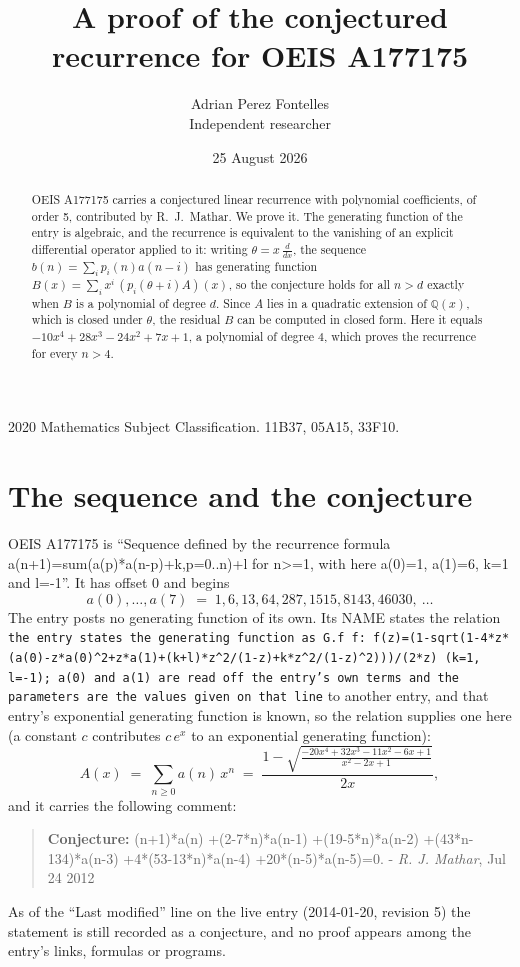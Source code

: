 \documentclass[11pt,a4paper]{article}
\title{A proof of the conjectured recurrence for OEIS A177175}
\author{Adrian Perez Fontelles\\ \small Independent researcher}
\date{25 August 2026}
\theoremstyle{plain}
\theoremstyle{definition}
\begin{document}
\maketitle

\begin{abstract}
OEIS A177175 carries a conjectured linear recurrence with polynomial coefficients, of
order 5, contributed by R.~J.~Mathar. We prove it. The generating function of the
entry is algebraic, and the recurrence is equivalent to the vanishing of an explicit
differential operator applied to it: writing $\theta=x\,\frac{d}{dx}$, the sequence
$b(n)=\sum_{i}p_{i}(n)a(n-i)$ has generating function
$B(x)=\sum_{i}x^{i}\,(p_{i}(\theta+i)A)(x)$, so the conjecture holds for all $n>d$ exactly
when $B$ is a polynomial of degree $d$. Since $A$ lies in a quadratic extension of
$\mathbb{Q}(x)$, which is closed under $\theta$, the residual $B$ can be computed in
closed form. Here it equals $- 10 x^{4} + 28 x^{3} - 24 x^{2} + 7 x + 1$, a polynomial of degree $4$, which proves
the recurrence for every $n>4$.
\end{abstract}

\noindent\small 2020 Mathematics Subject Classification. 11B37, 05A15, 33F10.\normalsize

\section{The sequence and the conjecture}

OEIS A177175 is ``Sequence defined by the recurrence formula a(n+1)=sum(a(p)*a(n-p)+k,p=0..n)+l for n>=1, with here a(0)=1, a(1)=6, k=1 and l=-1''. It has offset $0$ and begins
\[
a(0),\dots,a(7)\;=\;1, 6, 13, 64, 287, 1515, 8143, 46030,\ \dots
\]
The entry posts no generating function of its own. Its NAME states the
relation \texttt{the entry states the generating function as G.f f: f(z)=(1-sqrt(1-4*z*(a(0)-z*a(0)\textasciicircum{}2+z*a(1)+(k+l)*z\textasciicircum{}2/(1-z)+k*z\textasciicircum{}2/(1-z)\textasciicircum{}2)))/(2*z) (k=1, l=-1); a(0) and a(1) are read off the entry's own terms and the parameters are the values given on that line} to another entry, and that entry's exponential generating
function is known, so the relation supplies one here (a constant $c$ contributes
$c\,e^{x}$ to an exponential generating function):
\begin{equation}\label{eq:gf}
A(x)\;=\;\sum_{n\ge 0} a(n)\,x^{n}\;=\;\frac{1 - \sqrt{\frac{- 20 x^{4} + 32 x^{3} - 11 x^{2} - 6 x + 1}{x^{2} - 2 x + 1}}}{2 x} ,
\end{equation}
and it carries the following comment:
\begin{quote}\small
\textbf{Conjecture:} (n+1)*a(n) +(2-7*n)*a(n-1) +(19-5*n)*a(n-2) +(43*n-134)*a(n-3) +4*(53-13*n)*a(n-4) +20*(n-5)*a(n-5)=0. - \emph{R. J. Mathar}, Jul 24 2012
\end{quote}
As of the ``Last modified'' line on the live entry (2014-01-20, revision 5) the
statement is still recorded as a conjecture, and no proof appears among the entry's links,
formulas or programs.
\end{document}

